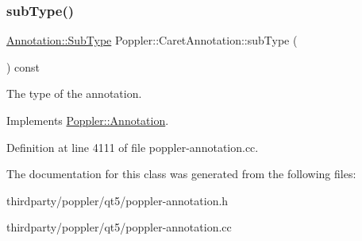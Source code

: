 \subsubsection{\texorpdfstring{sub\+Type()}{subType()}}
{\footnotesize\ttfamily \hyperlink{class_poppler_1_1_annotation_a2d592999c330949d64679cfa9e81113f}{Annotation\+::\+Sub\+Type} Poppler\+::\+Caret\+Annotation\+::sub\+Type (\begin{DoxyParamCaption}{ }\end{DoxyParamCaption}) const\hspace{0.3cm}{\ttfamily [virtual]}}

The type of the annotation. 

Implements \hyperlink{class_poppler_1_1_annotation_aef7fa1532193b41fbeba6e577579d984}{Poppler\+::\+Annotation}.



Definition at line 4111 of file poppler-\/annotation.\+cc.



The documentation for this class was generated from the following files\+:\begin{DoxyCompactItemize}
\item 
thirdparty/poppler/qt5/poppler-\/annotation.\+h\item 
thirdparty/poppler/qt5/poppler-\/annotation.\+cc\end{DoxyCompactItemize}
